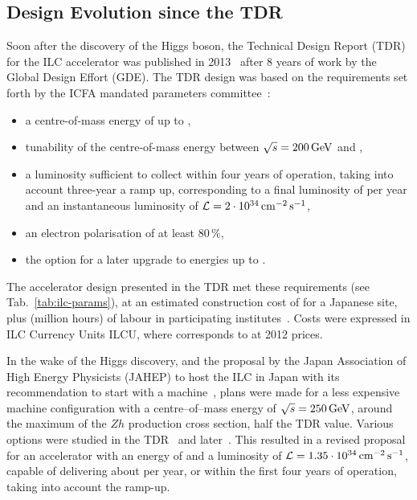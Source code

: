 \subsection{Design Evolution since the TDR}
\label{sec:design_evo}

Soon  after the discovery of the Higgs boson, the Technical Design Report (TDR) for the ILC accelerator was published in 2013~\cite{Adolphsen:2013jya,Adolphsen:2013kya} after 8 years of work by the Global Design Effort (GDE).
The TDR design was based on the requirements set forth by the ICFA mandated parameters committee~\cite{Heuer:2006}:
\begin{itemize}
\item a centre-of-mass energy of up to ,
\item tunability of the centre-of-mass energy between $\sqrt{s} = 200\,{\mathrm{GeV}}$
 and ,
\item  a luminosity sufficient to collect  within four years of operation, taking into account three-year a ramp up, corresponding to a final luminosity of  per year and an instantaneous luminosity of ${\mathcal{L}} = 2 \cdot 10^{34}\,{\mathrm{cm^{-2}\,s^{-1}}}$,
\item an electron polarisation of at least $80\,\%$,
\item  the option for a later upgrade to energies  up to .
\end{itemize}

The accelerator design presented in the TDR met these requirements (see Tab.~\ref{tab:ilc-params}), at an estimated construction cost of  for a Japanese site, plus  (million hours) of labour in participating institutes~\cite[Sec. 15.8.4]{Adolphsen:2013kya}. 
Costs were expressed in ILC Currency Units ILCU, where  corresponds to  at 2012 prices.

In the wake of the Higgs discovery, and the proposal by the Japan Association of High Energy Physicists (JAHEP) to host the ILC in Japan\cite{JAHEP:2012a} with its recommendation to start with a  machine~\cite{JAHEP:2012b}, plans were made for a less expensive machine configuration with a centre--of--mass energy of $\sqrt{s} = 250\,{\mathrm{GeV}}$, around the maximum of the $Zh$ production cross section, half the TDR value.
Various options were studied in the TDR~\cite[Sect. 12.5]{Adolphsen:2013kya} and later~\cite{Dugan:2014}.
This resulted in a revised proposal~\cite{Evans:2017rvt} for an accelerator with an energy of  and a luminosity of ${\mathcal{L}} = 1.35 \cdot 10^{34}\,{\mathrm{cm^{-2}\,s^{-1}}}$, capable of delivering about  per year, or  within the first four years of operation, taking into account the ramp-up.

